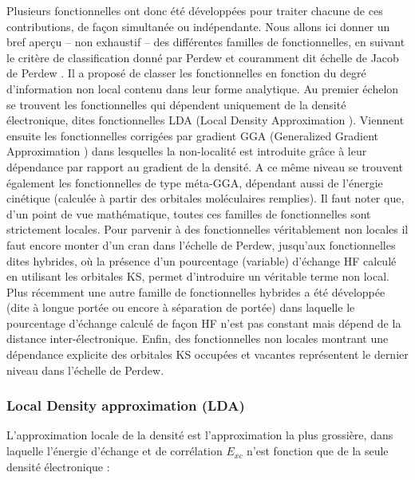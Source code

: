 	Plusieurs fonctionnelles ont donc été développées pour traiter chacune de ces contributions, de façon simultanée ou indépendante. Nous allons ici donner un bref aperçu -- non exhaustif -- des différentes familles de fonctionnelles, en suivant le critère de classification donné par Perdew et couramment dit \og échelle de Jacob de Perdew \fg{}. Il a proposé de classer les fonctionnelles en fonction du degré d’information non local contenu dans leur forme analytique. Au premier échelon se trouvent les fonctionnelles qui dépendent uniquement de la densité électronique, dites fonctionnelles LDA (\og Local Density Approximation \fg{}). Viennent ensuite les fonctionnelles corrigées par gradient GGA (\og Generalized Gradient Approximation \fg{}) dans lesquelles la non-localité est introduite grâce à leur dépendance par rapport au gradient de la densité. A ce même niveau se trouvent également les fonctionnelles de type méta-GGA, dépendant aussi de l’énergie cinétique (calculée à partir des orbitales moléculaires remplies). Il faut noter que, d’un point de vue mathématique, toutes ces familles de fonctionnelles sont strictement locales. Pour parvenir à des fonctionnelles véritablement non locales il faut encore monter d’un cran dans l’échelle de Perdew, jusqu’aux fonctionnelles dites hybrides, où la présence d’un pourcentage (variable) d’échange HF calculé en utilisant les orbitales KS, permet d’introduire un véritable terme non local. Plus récemment une autre famille de fonctionnelles hybrides a été développée (dite à longue portée ou encore à séparation de portée) dans laquelle le pourcentage d’échange calculé de façon HF n’est pas constant mais dépend de la distance inter-électronique. Enfin, des fonctionnelles non locales montrant une dépendance explicite des orbitales KS occupées et vacantes représentent le dernier niveau dans l’échelle de Perdew.
	
	\subsubsection{Local Density approximation (LDA)}\label{lda}
	
	L’approximation locale de la densité est l’approximation la plus grossière, dans laquelle l’énergie d’échange et de corrélation $E_{xc}$ n’est fonction que de la seule densité électronique :
	
